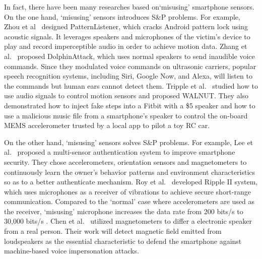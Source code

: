 In fact, there have been many researches based on`misusing' smartphone sensors. On the one hand, `misusing' sensors introduces S\&P problems. For example, Zhou et al~\cite{zhou2018patternlistener} designed PatternListener, which cracks Android pattern lock using acoustic signals. It leverages speakers and microphones of the victim's device to play and record imperceptible audio in order to achieve motion data.
Zhang et al.~\cite{zhang2017dolphinattack} proposed DolphinAttack, which uses normal speakers to send inaudible voice commands. Since they modulated voice commands on ultrasonic carriers, popular speech recognition systems, including Siri, Google Now, and Alexa, will listen to the commands but human ears cannot detect them. Tripple et al.~\cite{trippel2017walnut} studied how to use audio signals to control motion sensors and proposed WALNUT. They also demonstrated how to inject fake steps into a Fitbit with a \$5 speaker and how to use a malicious music file from a smartphone's speaker to control the on-board MEMS accelerometer trusted by a local app to pilot a toy RC car. 

On the other hand, `misusing' sensors solves S\&P problems. 
For example, Lee et al.~\cite{lee2015multi} proposed a multi-sensor authentication system to improve smartphone security. They chose accelerometers, orientation sensors and magnetometers to continuously learn the owner's behavior patterns and environment characteristics so as to a better authenticate mechanism. 
Roy et al.~\cite{roy2016ripple} developed Ripple II system, which uses microphones as a receiver of vibrations to achieve secure short-range communication. Compared to the `normal' case where accelerometers are used as the receiver, `misusing' microphone increases the data rate from  200 bits/s to 30,000 bits/s .  
Chen et al.~\cite{chen2017you} utilized magnetometers to differ a electronic speaker from a real person. Their work will detect magnetic field emitted from loudspeakers as the essential characteristic to defend the smartphone against machine-based voice impersonation attacks.


